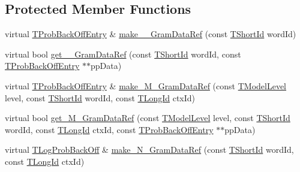 \subsection*{Protected Member Functions}
\begin{DoxyCompactItemize}
\item 
virtual \hyperlink{structuva_1_1smt_1_1tries_1_1_t_prob_back_off_entry}{T\+Prob\+Back\+Off\+Entry} \& \hyperlink{classuva_1_1smt_1_1tries_1_1_w2_c_array_trie_a03f78ff48156ebd1cedc62a430154894}{make\+\_\+\_\+\+Gram\+Data\+Ref} (const \hyperlink{namespaceuva_1_1smt_1_1hashing_adcf22e1982ad09d3a63494c006267469}{T\+Short\+Id} word\+Id)
\item 
virtual bool \hyperlink{classuva_1_1smt_1_1tries_1_1_w2_c_array_trie_ac8ec6581e99427bc4c6ba872ac1c1a45}{get\+\_\+\_\+\+Gram\+Data\+Ref} (const \hyperlink{namespaceuva_1_1smt_1_1hashing_adcf22e1982ad09d3a63494c006267469}{T\+Short\+Id} word\+Id, const \hyperlink{structuva_1_1smt_1_1tries_1_1_t_prob_back_off_entry}{T\+Prob\+Back\+Off\+Entry} $\ast$$\ast$pp\+Data)
\item 
virtual \hyperlink{structuva_1_1smt_1_1tries_1_1_t_prob_back_off_entry}{T\+Prob\+Back\+Off\+Entry} \& \hyperlink{classuva_1_1smt_1_1tries_1_1_w2_c_array_trie_afa8a36f03c66f8566104ce1d9f9e9b48}{make\+\_\+\+M\+\_\+\+Gram\+Data\+Ref} (const \hyperlink{namespaceuva_1_1smt_1_1tries_a20577a44b3a42d26524250634379b7cb}{T\+Model\+Level} level, const \hyperlink{namespaceuva_1_1smt_1_1hashing_adcf22e1982ad09d3a63494c006267469}{T\+Short\+Id} word\+Id, const \hyperlink{namespaceuva_1_1smt_1_1hashing_a5992ac0dea0fb3226fb403ede09fad55}{T\+Long\+Id} ctx\+Id)
\item 
virtual bool \hyperlink{classuva_1_1smt_1_1tries_1_1_w2_c_array_trie_abae1ca7208e97b6afc52cfad46505b89}{get\+\_\+\+M\+\_\+\+Gram\+Data\+Ref} (const \hyperlink{namespaceuva_1_1smt_1_1tries_a20577a44b3a42d26524250634379b7cb}{T\+Model\+Level} level, const \hyperlink{namespaceuva_1_1smt_1_1hashing_adcf22e1982ad09d3a63494c006267469}{T\+Short\+Id} word\+Id, const \hyperlink{namespaceuva_1_1smt_1_1hashing_a5992ac0dea0fb3226fb403ede09fad55}{T\+Long\+Id} ctx\+Id, const \hyperlink{structuva_1_1smt_1_1tries_1_1_t_prob_back_off_entry}{T\+Prob\+Back\+Off\+Entry} $\ast$$\ast$pp\+Data)
\item 
virtual \hyperlink{namespaceuva_1_1smt_1_1tries_acd0660255dd9ef5d644f01de49102750}{T\+Log\+Prob\+Back\+Off} \& \hyperlink{classuva_1_1smt_1_1tries_1_1_w2_c_array_trie_aaf8951eaca948d4c8e61cd8f3db11328}{make\+\_\+\+N\+\_\+\+Gram\+Data\+Ref} (const \hyperlink{namespaceuva_1_1smt_1_1hashing_adcf22e1982ad09d3a63494c006267469}{T\+Short\+Id} word\+Id, const \hyperlink{namespaceuva_1_1smt_1_1hashing_a5992ac0dea0fb3226fb403ede09fad55}{T\+Long\+Id} ctx\+Id)

\end{DoxyCompactItemize}
